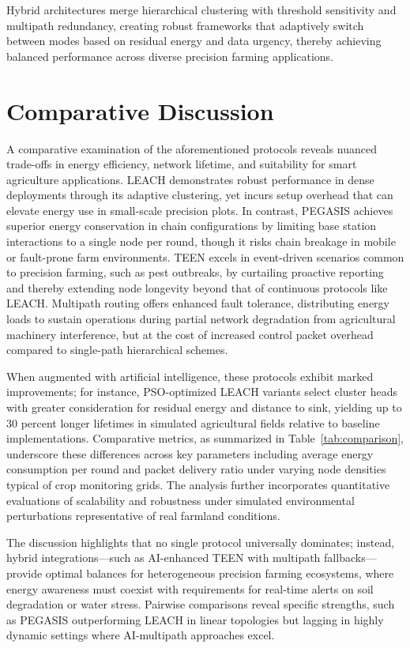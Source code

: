 \documentclass[12pt]{article}
\begin{document}
Hybrid architectures merge hierarchical clustering with threshold sensitivity and multipath redundancy, creating robust frameworks that adaptively switch between modes based on residual energy and data urgency, thereby achieving balanced performance across diverse precision farming applications.

\section{Comparative Discussion}

A comparative examination of the aforementioned protocols reveals nuanced trade-offs in energy efficiency, network lifetime, and suitability for smart agriculture applications. LEACH demonstrates robust performance in dense deployments through its adaptive clustering, yet incurs setup overhead that can elevate energy use in small-scale precision plots. In contrast, PEGASIS achieves superior energy conservation in chain configurations by limiting base station interactions to a single node per round, though it risks chain breakage in mobile or fault-prone farm environments. TEEN excels in event-driven scenarios common to precision farming, such as pest outbreaks, by curtailing proactive reporting and thereby extending node longevity beyond that of continuous protocols like LEACH. Multipath routing offers enhanced fault tolerance, distributing energy loads to sustain operations during partial network degradation from agricultural machinery interference, but at the cost of increased control packet overhead compared to single-path hierarchical schemes.

When augmented with artificial intelligence, these protocols exhibit marked improvements; for instance, PSO-optimized LEACH variants select cluster heads with greater consideration for residual energy and distance to sink, yielding up to 30 percent longer lifetimes in simulated agricultural fields relative to baseline implementations. Comparative metrics, as summarized in Table~\ref{tab:comparison}, underscore these differences across key parameters including average energy consumption per round and packet delivery ratio under varying node densities typical of crop monitoring grids. The analysis further incorporates quantitative evaluations of scalability and robustness under simulated environmental perturbations representative of real farmland conditions.

The discussion highlights that no single protocol universally dominates; instead, hybrid integrations—such as AI-enhanced TEEN with multipath fallbacks—provide optimal balances for heterogeneous precision farming ecosystems, where energy awareness must coexist with requirements for real-time alerts on soil degradation or water stress. Pairwise comparisons reveal specific strengths, such as PEGASIS outperforming LEACH in linear topologies but lagging in highly dynamic settings where AI-multipath approaches excel.
\end{document}
